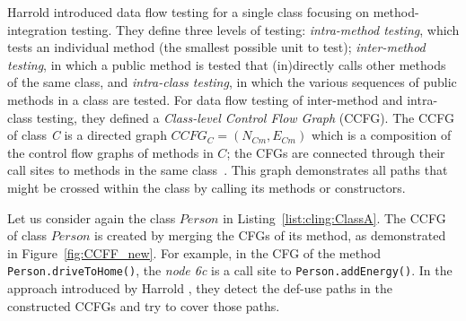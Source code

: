 Harrold \etal \cite{Harrold1994} introduced data flow testing for a single class focusing on method-integration testing. They define three levels of testing: \textit{intra-method testing}, which tests an individual method (\ie the smallest possible unit to test); \textit{inter-method testing}, in which a public method is tested that (in)directly calls other methods of the same class, and \textit{intra-class testing}, in which the various sequences of public methods in a class are tested. For data flow testing of inter-method and intra-class testing, they defined a \textit{Class-level Control Flow Graph} (CCFG). The CCFG of class \textit{C} is a directed graph $CCFG_C=(N_{Cm},E_{Cm})$ which is a composition of the control flow graphs of methods in $C$; the CFGs are connected through their call sites to methods in the same class~\cite{Harrold1994}. This graph demonstrates all paths that might be crossed within the class by calling its methods or constructors. 


Let us consider again the class $Person$ in Listing~\ref{list:cling:ClassA}. The CCFG of class $Person$ is created by merging the CFGs of its method, as demonstrated in Figure~\ref{fig:CCFF_new}.
For example, in the CFG of the method \texttt{Person.driveToHome()}, the \textit{node 6c} is a call site to \texttt{Person.addEnergy()}. In the approach introduced by Harrold \etal \cite{Harrold1994}, they detect the def-use paths in the constructed CCFGs and try to cover those paths.

%
%



